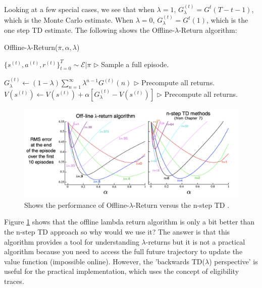 \documentclass[11pt]{article}
\begin{document}
Looking at a few special cases, we see that when $\lambda = 1$, $G_\lambda^{(t)} = G^{t}(T - t - 1)$, which is the Monte Carlo estimate. When $\lambda = 0$, $G_\lambda^{(t)} = G^{t}(1)$, which is the one step TD estimate. The following shows the Offline-$\lambda$-Return algorithm:

\begin{algorithm}[H]
\caption{Offline-$\lambda$-Return($\pi,\alpha, \lambda$)}
\label{algo:every_visit_mc}
\begin{algorithmic}[1]
    \STATE $\{s^{(t)},a^{(t)}, r^{(t)}\}_{t=0}^T \sim \mathcal{E}|\pi$ \hfill $\triangleright$ Sample a full episode.
    
        \STATE $G_\lambda^{(t)} \leftarrow (1-\lambda)\sum_{n=1}^\infty \lambda^{n-1} G^{(t)}(n)$ \hfill $\triangleright$ Precompute all returns.
    \ENDFOR
        \STATE $V(s^{(t)}) \leftarrow V(s^{(t)}) + \alpha[G_\lambda^{(t)} - V(s^{(t)})]$ \hfill $\triangleright$ Precompute all returns.
    \ENDFOR
    
\ENDFOR
\end{algorithmic}
\end{algorithm}

\begin{figure}
    \centering
    \includegraphics[width=\textwidth]{images/lam performance comparison.png}
    \caption{Shows the performance of Offline-$\lambda$-Return versus the n-step TD \cite{sutton2018reinforcement}.}
    \label{fig:comp}
\end{figure}

Figure \ref{fig:comp} shows that the offline lambda return algorithm is only a bit better than the n-step TD approach so why would we use it? The answer is that this algorithm provides a tool for understanding $\lambda$-returns but it is not a practical algorithm because you need to access the full future trajectory to update the value function (impossible online). However, the 'backwards TD($\lambda$) perspective' is useful for the practical implementation, which uses the concept of eligibility traces.
\end{document}
